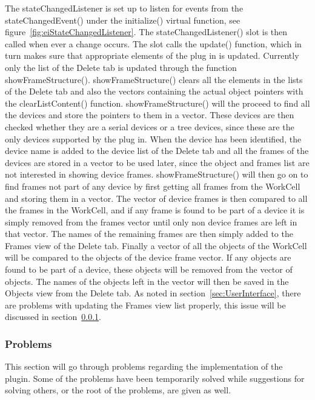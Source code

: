 The stateChangedListener is set up to listen for events from the stateChangedEvent() under the initialize() virtual function, see figure~\ref{fig:eiStateChangedListener}. The stateChangedListener() slot is then called when ever a change occurs. The slot calls the update() function, which in turn makes sure that appropriate elements of the plug in is updated. Currently only the list of the Delete tab is updated through the function showFrameStructure(). showFrameStructure() clears all the elements in the lists of the Delete tab and also the vectors containing the actual object pointers with the clearListContent() function. showFrameStructure() will the proceed to find all the devices and store the pointers to them in a vector. These devices are then checked whether they are a serial devices or a tree devices, since these are the only devices supported by the plug in. When the device has been identified, the device name is added to the device list of the Delete tab and all the frames of the devices are stored in a vector to be used later, since the object and frames list are not interested in showing device frames. 
showFrameStructure() will then go on to find frames not part of any device by first getting all frames from the WorkCell and storing them in a vector. The vector of device frames is then compared to all the frames in the WorkCell, and if any frame is found to be part of a device it is simply removed from the frames vector until only non device frames are left in that vector. The names of the remaining frames are then simply added to the Frames view of the Delete tab.
Finally a vector of all the objects of the WorkCell will be compared to the objects of the device frame vector. If any objects are found to be part of a device, these objects will be removed from the vector of objects. The names of the objects left in the vector will then be saved in the Objects view from the Delete tab.
As noted in section~\ref{sec:UserInterface}, there are problems with updating the Frames view list properly, this issue will be discussed in section~\ref{sec:eiProblems}.


\subsubsection{Problems}
\label{sec:eiProblems}
This section will go through problems regarding the implementation of the plugin. Some of the problems have been temporarily solved while suggestions for solving others, or the root of the problems, are given as well. \\


